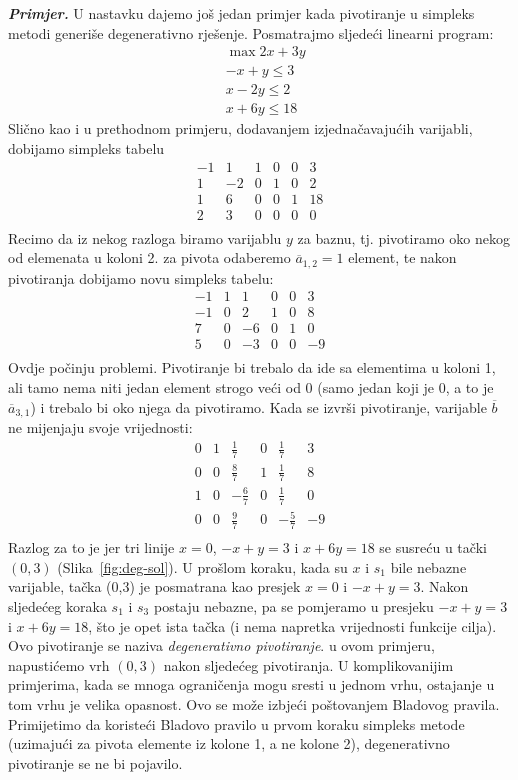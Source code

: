 \documentclass[a4paper, utf8, 11pt, colorlinks]{book}
\begin{document}
\emph{\textbf{Primjer.}} U nastavku dajemo još jedan primjer kada pivotiranje u simpleks metodi generiše degenerativno rješenje. 
Posmatrajmo sljedeći linearni program:
\begin{align*}
    &\max 2x + 3y \\
	& -x + y \leq 3 \\
	& x - 2y \leq 2 \\
	& x + 6y \leq 18
\end{align*}
Slično kao i u prethodnom primjeru, dodavanjem izjednačavajućih varijabli, dobijamo simpleks 
tabelu 
$$\begin{array}{ccccc|c}
     -1 & 1 & 1 & 0 & 0 & 3 \\
      1 &-2 & 0 & 1 & 0 & 2 \\
      1 & 6 & 0 & 0 & 1 & 18 \\ \hline
      2 & 3 & 0 & 0 & 0 & 0 \\
\end{array}$$
Recimo da iz nekog razloga biramo varijablu $y$ za baznu, tj. pivotiramo oko nekog od elemenata u koloni 2. za pivota odaberemo $\overline{a}_{1,2}=1$ element, te nakon pivotiranja dobijamo novu simpleks tabelu:
$$\begin{array}{ccccc|c}
	-1 & 1 & 1 & 0 & 0 & 3 \\
    -1 & 0 & 2 & 1 & 0 & 8 \\
    7 & 0 & -6 & 0 & 1 & 0 \\ \hline
    5 & 0 & -3 & 0 & 0 & -9 \\
\end{array}$$
Ovdje počinju problemi. Pivotiranje bi trebalo da ide sa elementima u koloni 1, ali tamo nema niti jedan element strogo veći od 0 (samo jedan koji je 0, a to je $\overline{a}_{3,1}$) i trebalo bi oko njega da pivotiramo. Kada se izvrši pivotiranje, varijable $\overline{b}$ ne mijenjaju svoje vrijednosti:
$$\begin{array}{ccccc|c}
     0 & 1 & \frac{1}{7}  & 0 & \frac{1}{7} & 3 \\
     0 & 0 & \frac{8}{7}  & 1 & \frac{1}{7} & 8 \\
     1 & 0 & -\frac{6}{7} & 0 & \frac{1}{7} & 0 \\ \hline
     0 & 0 & \frac{9}{7}  & 0 & -\frac{5}{7} & -9 \\
\end{array}$$
Razlog za to je jer tri linije $x=0$, $-x+y=3$ i $x+6y=18$ se susreću u tački $(0,3)$ (Slika~\ref{fig:deg-sol}). U prošlom koraku, kada su $x$ i $s_1$ bile nebazne varijable, tačka (0,3) je posmatrana kao presjek $x=0$ i $-x +y =3$. Nakon sljedećeg koraka $s_1$ i $s_3$ postaju nebazne, pa se pomjeramo u presjeku 
$-x+y=3$ i $x+6y=18$, što je opet ista tačka (i nema napretka vrijednosti funkcije cilja). 
 Ovo pivotiranje se naziva \emph{degenerativno pivotiranje}. u ovom primjeru, napustićemo vrh $(0,3)$ nakon sljedećeg pivotiranja. U komplikovanijim primjerima, kada se mnoga ograničenja mogu sresti u jednom vrhu, ostajanje u tom vrhu je velika opasnost. Ovo se može izbjeći poštovanjem 
 Bladovog pravila. Primijetimo da koristeći Bladovo pravilo u prvom koraku simpleks metode (uzimajući za pivota elemente iz kolone 1, a ne kolone 2), degenerativno pivotiranje se ne bi pojavilo.  
\end{document}
